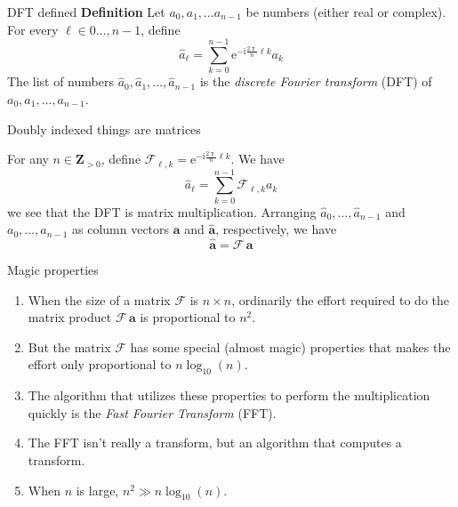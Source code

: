 \documentclass[portrait,fleqn,12pt]{beamer}
\newcommand{\integers}{\mathbf{Z}}
\newcommand{\euler}{\mathrm{e}}
\newcommand{\imag}{\mathrm{i}}
\newenvironment{handlist}
   {\begin{enumerate}[\faHandPointRight]
       \addtolength{\itemsep}{0.0\itemsep}}
     {\end{enumerate}}
\newenvironment{define}[1]{
  \textbf{Definition} #1}{}
\begin{document}
  \begin{frame}{DFT defined}
  \begin{define}  Let $a_0, a_1, \dots a_{n-1}$ be numbers (either real or complex).   For every $\ell \in 0 \dots, n-1$, define
  \begin{equation*}
      \widehat a_\ell = \sum_{k=0}^{n-1}  \euler^{-  \imag \frac{2 \uppi}{n}  \ell  k} a_k
  \end{equation*}
  The list of numbers  $\widehat a_0,  \widehat a_1, \dots, \widehat a_{n-1}$ is the \emph{discrete Fourier transform} (DFT) of 
  $a_0, a_1, \dots, a_{n-1}$.
  
  \end{define}
  \end{frame}
  
  \begin{frame}{Doubly indexed things are matrices}
 
 For any $n \in \integers_{>0}$, define $\mathcal{F}_{\ell, k}  = \euler^{-  \imag \frac{2 \uppi}{n}  \ell  k}$. We  have
   \begin{equation*}
      \widehat a_\ell = \sum_{k=0}^{n-1}  \mathcal{F}_{\ell, k} a_k
  \end{equation*}
  we see that the DFT is matrix multiplication. Arranging $\widehat a_0, \dots, \widehat a_{n-1}$ and  
   $a_0, \dots, a_{n-1}$ as column vectors $\mathbf{a}$ and  $\widehat{\mathbf{a}}$,  respectively, we have
    \begin{equation*}
      \widehat{\mathbf{a}}  = \mathcal{F} \, \mathbf{a}
  \end{equation*}
  
    \end{frame}
    
     \begin{frame}{Magic properties}
     
     \begin{handlist}
     \item When the size of a matrix $\mathcal{F}$ is $n\times n$, ordinarily  the effort required to do the matrix product $ \mathcal{F} \, \mathbf{a}$ is proportional to $n^2$.  
     
     \item But the matrix $\mathcal{F}$ has some special (almost magic) properties that 
     makes the effort only proportional to 
     $n \log_{10}( n)$.
     
     \item The algorithm that utilizes these properties to perform the multiplication quickly is the \emph{Fast Fourier Transform} (FFT).
     
     \item The FFT isn't really a transform, but an algorithm that computes a transform.
     
     \item When $n$ is large, $n^2 \gg n \log_{10}(n)$.
 
 \end{handlist}
  
    \end{frame}
    
\end{document}
